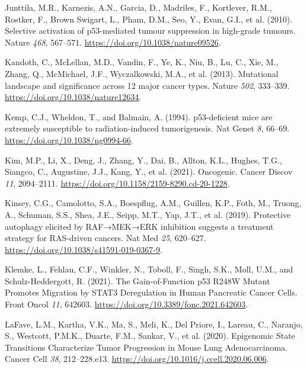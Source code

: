 \begin{CSLReferences}{0}{0}
\leavevmode{}%
Junttila, M.R., Karnezis, A.N., Garcia, D., Madriles, F., Kortlever, R.M., Rostker, F., Brown Swigart, L., Pham, D.M., Seo, Y., Evan, G.I., et al. (2010). Selective activation of p53-mediated tumour suppression in high-grade tumours. Nature \emph{468}, 567--571. \url{https://doi.org/10.1038/nature09526}.

\leavevmode{}%
Kandoth, C., McLellan, M.D., Vandin, F., Ye, K., Niu, B., Lu, C., Xie, M., Zhang, Q., McMichael, J.F., Wyczalkowski, M.A., et al. (2013). Mutational landscape and significance across 12 major cancer types. Nature \emph{502}, 333--339. \url{https://doi.org/10.1038/nature12634}.

\leavevmode{}%
Kemp, C.J., Wheldon, T., and Balmain, A. (1994). p53-deficient mice are extremely susceptible to radiation-induced tumorigenesis. Nat Genet \emph{8}, 66--69. \url{https://doi.org/10.1038/ng0994-66}.

\leavevmode{}%
Kim, M.P., Li, X., Deng, J., Zhang, Y., Dai, B., Allton, K.L., Hughes, T.G., Siangco, C., Augustine, J.J., Kang, Y., et al. (2021). Oncogenic. Cancer Discov \emph{11}, 2094--2111. \url{https://doi.org/10.1158/2159-8290.cd-20-1228}.

\leavevmode{}%
Kinsey, C.G., Camolotto, S.A., Boespflug, A.M., Guillen, K.P., Foth, M., Truong, A., Schuman, S.S., Shea, J.E., Seipp, M.T., Yap, J.T., et al. (2019). Protective autophagy elicited by RAF→MEK→ERK inhibition suggests a treatment strategy for RAS-driven cancers. Nat Med \emph{25}, 620--627. \url{https://doi.org/10.1038/s41591-019-0367-9}.

\leavevmode{}%
Klemke, L., Fehlau, C.F., Winkler, N., Toboll, F., Singh, S.K., Moll, U.M., and Schulz-Heddergott, R. (2021). The Gain-of-Function p53 R248W Mutant Promotes Migration by STAT3 Deregulation in Human Pancreatic Cancer Cells. Front Oncol \emph{11}, 642603. \url{https://doi.org/10.3389/fonc.2021.642603}.

\leavevmode{}%
LaFave, L.M., Kartha, V.K., Ma, S., Meli, K., Del Priore, I., Lareau, C., Naranjo, S., Westcott, P.M.K., Duarte, F.M., Sankar, V., et al. (2020). Epigenomic State Transitions Characterize Tumor Progression in Mouse Lung Adenocarcinoma. Cancer Cell \emph{38}, 212--228.e13. \url{https://doi.org/10.1016/j.ccell.2020.06.006}.


\end{CSLReferences}
